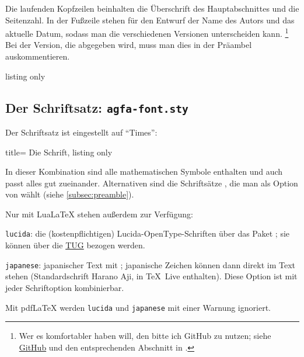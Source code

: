 \subsubsection{}\label{subsec:kopfzeile}
%
Die laufenden Kopfzeilen beinhalten die Überschrift des Hauptabschnittes und die Seitenzahl.
In der Fußzeile stehen für den Entwurf der Name des Autors und das aktuelle Datum, sodass man die verschiedenen Versionen unterscheiden kann.%
\footnote{Wer es komfortabler haben will, den bitte ich GitHub zu nutzen; siehe \href{https://github.com}{GitHub} und den entsprechenden Abschnitt in \textcite{schlosser:2016}.}
Bei der Version, die abgegeben wird, muss man dies in der Präambel auskommentieren.

%
\begin{tcblisting}{listing only}
\rofoot{\today}
\end{tcblisting}
%
\subsection{Der Schriftsatz: \texttt{agfa-font.sty}}\label{agfa-font}
%
Der Schriftsatz ist eingestellt auf \enquote{Times}: 
\begin{tcblisting}{title= Die Schrift, listing only}
\RequirePackage{mathptmx}	%
\RequirePackage[scaled=.90]{helvet}
\RequirePackage{courier} 
\end{tcblisting}
%
In dieser Kombination sind alle mathematischen Symbole enthalten und auch passt alles gut zueinander.
Alternativen sind die Schriftsätze \href{https://www.ctan.org/pkg/lm}{} \bzw 
\href{https://www.ctan.org/pkg/libertinus}{}, die man als Option von  wählt (siehe \vref{subsec:preamble}).

Nur mit Lua\LaTeX{} stehen außerdem zur Verfügung:
%
\begin{myitemize}
\item
\texttt{lucida}: die (kostenpflichtigen) Lucida-OpenType-Schriften über das Paket ; sie können über die \href{https://tug.org/store/lucida/}{TUG} bezogen werden.

\item
\texttt{japanese}: japanischer Text mit ; japanische Zeichen können dann direkt im Text stehen (Standardschrift Harano Aji, in \TeX~Live enthalten).
Diese Option ist mit jeder Schriftoption kombinierbar.
\end{myitemize}
%
Mit pdf\LaTeX{} werden \texttt{lucida} und \texttt{japanese} mit einer Warnung ignoriert.
%
